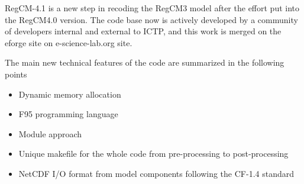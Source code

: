 %
%

RegCM-4.1 is a new step in recoding the RegCM3 model after the effort put into
the RegCM4.0 version. The code base now is actively developed by a community
of developers internal and external to ICTP, and this work is merged on the
eforge site on e-science-lab.org site.

The main new technical features of the code are summarized in the following
points

\begin{itemize}
\item Dynamic memory allocation
\item F95 programming language
\item Module approach
\item Unique makefile for the whole code from pre-processing to post-processing
\item NetCDF I/O format from model components following the CF-1.4 standard
\end{itemize}


